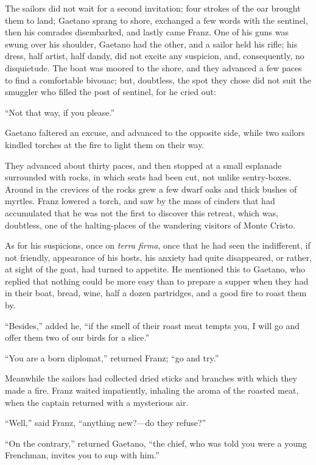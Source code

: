 The sailors did not wait for a second invitation; four strokes of the
oar brought them to land; Gaetano sprang to shore, exchanged a few
words with the sentinel, then his comrades disembarked, and lastly came
Franz. One of his guns was swung over his shoulder, Gaetano had the
other, and a sailor held his rifle; his dress, half artist, half dandy,
did not excite any suspicion, and, consequently, no disquietude. The
boat was moored to the shore, and they advanced a few paces to find a
comfortable bivouac; but, doubtless, the spot they chose did not suit
the smuggler who filled the post of sentinel, for he cried out:

“Not that way, if you please.”

Gaetano faltered an excuse, and advanced to the opposite side, while
two sailors kindled torches at the fire to light them on their way.

They advanced about thirty paces, and then stopped at a small esplanade
surrounded with rocks, in which seats had been cut, not unlike
sentry-boxes. Around in the crevices of the rocks grew a few dwarf oaks
and thick bushes of myrtles. Franz lowered a torch, and saw by the mass
of cinders that had accumulated that he was not the first to discover
this retreat, which was, doubtless, one of the halting-places of the
wandering visitors of Monte Cristo.

As for his suspicions, once on \textit{terra firma}, once that he had seen the
indifferent, if not friendly, appearance of his hosts, his anxiety had
quite disappeared, or rather, at sight of the goat, had turned to
appetite. He mentioned this to Gaetano, who replied that nothing could
be more easy than to prepare a supper when they had in their boat,
bread, wine, half a dozen partridges, and a good fire to roast them by.

“Besides,” added he, “if the smell of their roast meat tempts you, I
will go and offer them two of our birds for a slice.”

“You are a born diplomat,” returned Franz; “go and try.”

Meanwhile the sailors had collected dried sticks and branches with
which they made a fire. Franz waited impatiently, inhaling the aroma of
the roasted meat, when the captain returned with a mysterious air.

“Well,” said Franz, “anything new?—do they refuse?”

“On the contrary,” returned Gaetano, “the chief, who was told you were
a young Frenchman, invites you to sup with him.”

